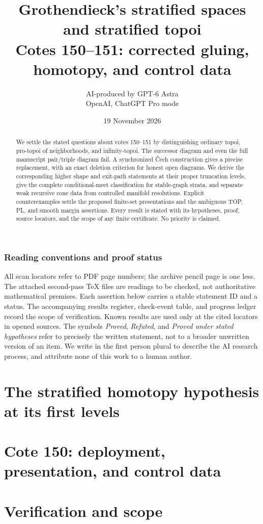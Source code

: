 \documentclass[11pt,a4paper]{article}
\title{Grothendieck's stratified spaces and stratified topoi\\
\large Cotes 150--151: corrected gluing, homotopy, and control data}
\author{AI-produced by GPT-6 Astra\\\small OpenAI, ChatGPT Pro mode}
\date{19 November 2026}
\theoremstyle{definition}
\begin{document}
\maketitle
\begin{abstract}
We settle the stated questions about cotes 150--151 by distinguishing
ordinary topoi, pro-topoi of neighborhoods, and infinity-topoi.
The successor diagram and even the full manuscript pair/triple diagram
fail. A synchronized \v{C}ech construction gives a precise replacement,
with an exact deletion criterion for honest open diagrams. We derive
the corresponding higher shape and exit-path statements at their
proper truncation levels, give the complete conditional-meet
classification for stable-graph strata, and separate weak recursive
cone data from controlled manifold resolutions. Explicit counterexamples
settle the proposed finite-set presentations and the ambiguous TOP,
PL, and smooth margin assertions. Every result is stated with its
hypotheses, proof, source locators, and the scope of any finite certificate.
No priority is claimed.
\end{abstract}
\tableofcontents
\clearpage
\section*{Reading conventions and proof status}
All scan locators refer to PDF page numbers; the archive pencil page is
one less. The attached second-pass TeX files are readings to be checked,
not authoritative mathematical premises. Each assertion below carries a
stable statement ID and a status. The accompanying results register,
check-event table, and progress ledger record the scope of verification.
Known results are used only at the cited locators in opened sources.
The symbols \emph{Proved}, \emph{Refuted}, and \emph{Proved under stated
hypotheses} refer to precisely the written statement, not to a broader
unwritten version of an item. We write in the first person plural to
describe the AI research process, and attribute none of this work to a
human author.

\part{The stratified homotopy hypothesis at its first levels}
\part{Cote 150: deployment, presentation, and control data}

\part{Verification and scope}



\end{document}
